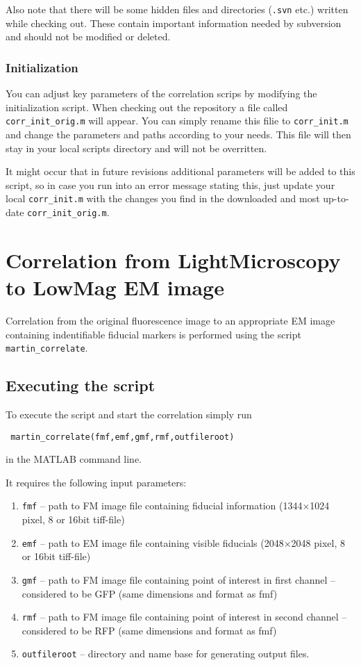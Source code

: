 \documentclass[10pt,a4paper,onepage,DIV12]{scrartcl}
\begin{document}
Also note that there will be some hidden files and directories (\texttt{.svn} etc.) written while checking out. These contain important information needed by subversion and should not be modified or deleted.

\subsubsection*{Initialization}

You can adjust key parameters of the correlation scrips by modifying the initialization script. When checking out the repository a file called \texttt{corr\_init\_orig.m} will appear. You can simply rename this filie to \texttt{corr\_init.m} and change the parameters and paths according to your needs. This file will then stay in your local scripts directory and will not be overritten.

 It might occur that in future revisions additional parameters will be added to this script, so in case you run into an error message stating this, just update your local \texttt{corr\_init.m} with the changes you find in the downloaded and most up-to-date \texttt{corr\_init\_orig.m}.


\section{Correlation from LightMicroscopy to LowMag EM image}

Correlation from the original fluorescence image to an appropriate EM image containing indentifiable fiducial markers is performed using the script \texttt{martin\_correlate}.

\subsection{Executing the script}
To execute the script and start the correlation simply run \begin{verbatim}
 martin_correlate(fmf,emf,gmf,rmf,outfileroot)
\end{verbatim}
 in the MATLAB command line.
 
It requires the following input parameters:
\begin{enumerate}
 \item\texttt{fmf} -- path to FM image file containing fiducial information (1344$\times$1024 pixel, 8 or 16bit tiff-file)
 \item\texttt{emf} -- path to EM image file containing visible fiducials (2048$\times$2048 pixel, 8 or 16bit tiff-file)
 \item\texttt{gmf} -- path to FM image file containing point of interest in first channel -- considered to be GFP (same dimensions and format as fmf)
 \item\texttt{rmf} -- path to FM image file containing point of interest in second channel -- considered to be RFP (same dimensions and format as fmf)
 \item\texttt{outfileroot} -- directory and name base for generating output files.
\end{enumerate}
\end{document}
